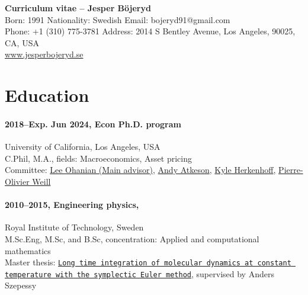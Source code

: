 \documentclass[letterpaper,10pt]{article}
\begin{document}
\begin{center}
{\Large \textbf{Curriculum vitae -- Jesper Böjeryd}}\\[3pt]
Born: 1991 \hspace{6pt} Nationality: Swedish \hspace{6pt} Email: bojeryd91@gmail.com \\
Phone: +1 (310) 775-3781 \hspace{6pt} Address: 2014 S Bentley Avenue, Los Angeles, 90025, CA, USA \\
\url{www.jesperbojeryd.se}
\end{center}

\section*{Education}
\paragraph{2018--Exp. Jun 2024, Econ Ph.D. program}\hfill University of California, Los Angeles, USA\\
C.Phil, M.A., fields: Macroeconomics, Asset pricing\\
Committee: \href{https://www.leeohanian.com/}{Lee Ohanian (Main advisor)}, \href{https://sites.google.com/site/andyatkeson/}{Andy Atkeson}, \href{https://sites.google.com/site/kyleherkenhoff/}{Kyle Herkenhoff}, \href{https://sites.google.com/site/pierreolivierweill/}{Pierre-Olivier Weill}

\paragraph{2010--2015, Engineering physics,}\hfill Royal Institute of Technology, Sweden\\
M.Sc.Eng, M.Sc, and B.Sc, concentration: Applied and computational mathematics\\
Master thesis: \href{https://www.diva-portal.org/smash/record.jsf?pid=diva2\%3A808180&dswid=-588}{\texttt{Long time integration of mole\-cular dynamics at constant  temperature with the symplectic Euler method}}, supervised by  Anders Szepessy

\end{document}
